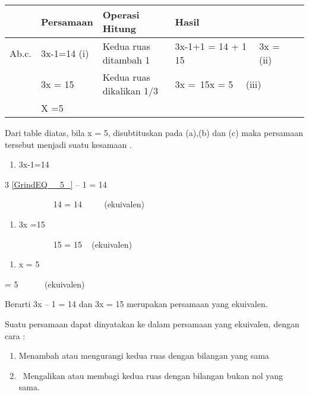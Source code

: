 \documentclass[11pt,fleqn]{book} %
\begin{document}
\noindent 

\begin{tabular}{|p{0.4in}|p{0.7in}|p{1.3in}|p{1.3in}|} \hline 
 & Persamaan & Operasi Hitung & Hasil \\ \hline 
A\newline \newline b.\newline \newline c. & 3x-1=14 (i) & Kedua ruas ditambah 1 & 3x-1+1 = 14 + 1~ ~\newline 3x = 15~~~~~~~~~~~~~~~ (ii) \\ \hline 
 & 3x = 15 & Kedua ruas dikalikan 1/3 & 3x =~15\newline x = 5~~ (iii) \\ \hline 
 & X =5 &  &  \\ \hline 
\end{tabular}

Dari table diatas, bila x = 5, disubtituskan pada (a),(b) dan (c) maka persamaan tersebut menjadi suatu kesamaan .

\begin{enumerate}
\item  3x-1=14~~~~~~~~~~~ ~~
\end{enumerate}

3 \eqref{GrindEQ__5_} -- 1 = 14

\noindent ~~~~~~~~~~~ 14 = 14 ~~~ ~(ekuivalen)

\begin{enumerate}
\item  3x =15
\end{enumerate}

\noindent ~~~~~~~~~~~ 15 = 15 ~ (ekuivalen)

\begin{enumerate}
\item  x = 5~~~~~~~~~~~~~~~~ 
\end{enumerate}

 = 5~ ~~~~ (ekuivalen)

\noindent 

\noindent Berarti 3x -- 1 = 14 dan 3x = 15 merupakan persamaan yang ekuivalen.

\noindent Suatu persamaan dapat dinyatakan ke dalam persamaan yang ekuivalen, dengan cara :

\begin{enumerate}
\item  Menambah atau mengurangi kedua ruas dengan bilangan yang sama

\item  ~Mengalikan atau membagi kedua ruas dengan bilangan bukan nol yang sama.
\end{enumerate}
\end{document}
